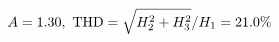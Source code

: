 \documentclass[preview]{standalone}
\begin{document}
\begin{align*}
\special{dvisvgm:raw <g id='unique000'>}A=1.30,\ \text{THD}=\sqrt{H_2^2+H_3^2}/H_1=21.0\%\special{dvisvgm:raw </g>}
\end{align*}
\end{document}
